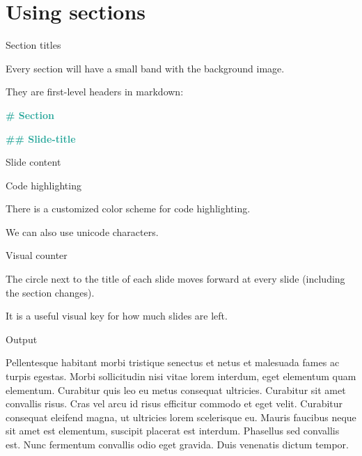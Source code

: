 \documentclass[11pt, compress, aspectratio=1610]{beamer}
\newenvironment{Shaded}{\begin{mdframed}}{\end{mdframed}}
\newcommand{\KeywordTok}[1]{\textcolor[rgb]{0.26,0.66,0.93}{\textbf{{#1}}}}
\newcommand{\FloatTok}[1]{\textcolor[HTML]{558B2F}{{#1}}}
\newcommand{\CharTok}[1]{\textcolor[HTML]{7E57C2}{{#1}}}
\newcommand{\StringTok}[1]{\textcolor[HTML]{7E57C2}{{#1}}}
\newcommand{\CommentTok}[1]{\textcolor[HTML]{546E7A}{\textit{{#1}}}}
\newcommand{\FunctionTok}[1]{\textcolor[HTML]{26A69A}{\textbf{{#1}}}}
\newcommand{\NormalTok}[1]{\textcolor[HTML]{212121}{{#1}}}
\begin{document}
\section{Using sections}\label{using-sections}

\begin{frame}[fragile]{Section titles}

Every section will have a small band with the background image.

They are first-level headers in markdown:

\begin{Shaded}
\begin{Highlighting}[]
\FunctionTok{# Section}

\FunctionTok{## Slide-title}

\NormalTok{Slide content}
\end{Highlighting}
\end{Shaded}

\end{frame}

\begin{frame}[fragile]{Code highlighting}

There is a customized color scheme for code highlighting.

\begin{Shaded}
\end{Shaded}

We can also use \alert{unicode characters}.

\end{frame}

\begin{frame}{Visual counter}

The circle next to the title of each slide moves forward at every slide
(including the section changes).

It is a useful visual key for how much slides are left.

\end{frame}

\begin{frame}{Output}

Pellentesque habitant morbi tristique senectus et netus et malesuada
fames ac turpis egestas. Morbi sollicitudin nisi vitae lorem interdum,
eget elementum quam elementum. Curabitur quis leo eu metus consequat
ultricies. Curabitur sit amet convallis risus. Cras vel arcu id risus
efficitur commodo et eget velit. Curabitur consequat eleifend magna, ut
ultricies lorem scelerisque eu. Mauris faucibus neque sit amet est
elementum, suscipit placerat est interdum. Phasellus sed convallis est.
Nunc fermentum convallis odio eget gravida. Duis venenatis dictum
tempor.

\end{frame}
\end{document}
